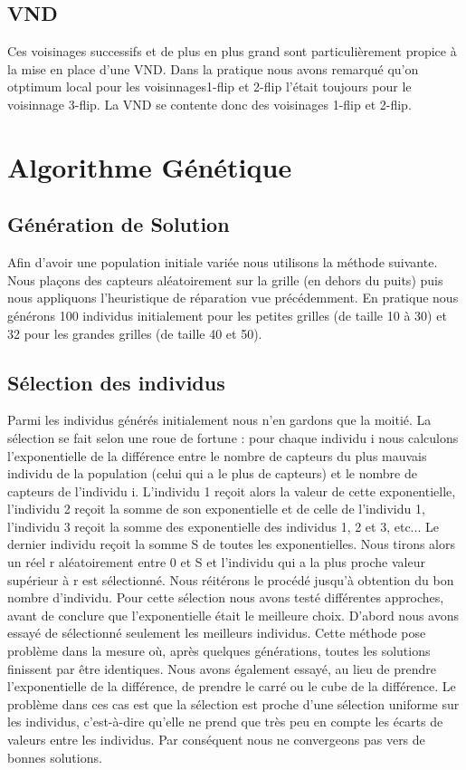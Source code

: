 \documentclass[12pt,a4paper]{article}
\begin{document}
\subsection{VND}
Ces voisinages successifs et de plus en plus grand sont particulièrement propice à la mise en place d'une VND. Dans la pratique nous avons remarqué qu'on otptimum local pour les voisinnages1-flip et 2-flip l'était toujours pour le voisinnage 3-flip. La VND se contente donc des voisinages 1-flip et 2-flip. 

\section{Algorithme Génétique}
\subsection{Génération de Solution}
Afin d'avoir une population initiale variée nous utilisons la méthode suivante. Nous plaçons des capteurs aléatoirement sur la grille (en dehors du puits) puis nous appliquons l'heuristique de réparation vue précédemment.
En pratique nous générons 100 individus initialement pour les petites grilles (de taille 10 à 30) et 32 pour les grandes grilles (de taille 40 et 50).
\subsection{Sélection des individus}
Parmi les individus générés initialement nous n'en gardons que la moitié. La sélection se fait selon une roue de fortune : pour chaque individu i nous calculons l'exponentielle de la différence entre le nombre de capteurs du plus mauvais individu de la population (celui qui a le plus de capteurs) et le nombre de capteurs de l'individu i. L'individu 1 reçoit alors la valeur de cette exponentielle, l'individu 2 reçoit la somme de son exponentielle et de celle de l'individu 1, l'individu 3 reçoit la somme des exponentielle des individus 1, 2 et 3, etc... Le dernier individu reçoit la somme S de toutes les exponentielles. Nous tirons alors un réel r aléatoirement entre 0 et S et l'individu qui a la plus proche valeur supérieur à r est sélectionné. Nous réitérons le procédé jusqu'à obtention du bon nombre d'individu. 
Pour cette sélection nous avons testé différentes approches, avant de conclure que l’exponentielle était le meilleure choix. D'abord nous avons essayé de sélectionné seulement les meilleurs individus. Cette méthode pose problème dans la mesure où, après quelques générations, toutes les solutions finissent par être identiques. Nous avons également essayé, au lieu de prendre l’exponentielle de la différence, de prendre le carré ou le cube de la différence. Le problème dans ces cas est que la sélection est proche d'une sélection uniforme sur les individus, c'est-à-dire qu'elle ne prend que très peu en compte les écarts de valeurs entre les individus. Par conséquent nous ne convergeons pas vers de bonnes solutions. 
\end{document}
